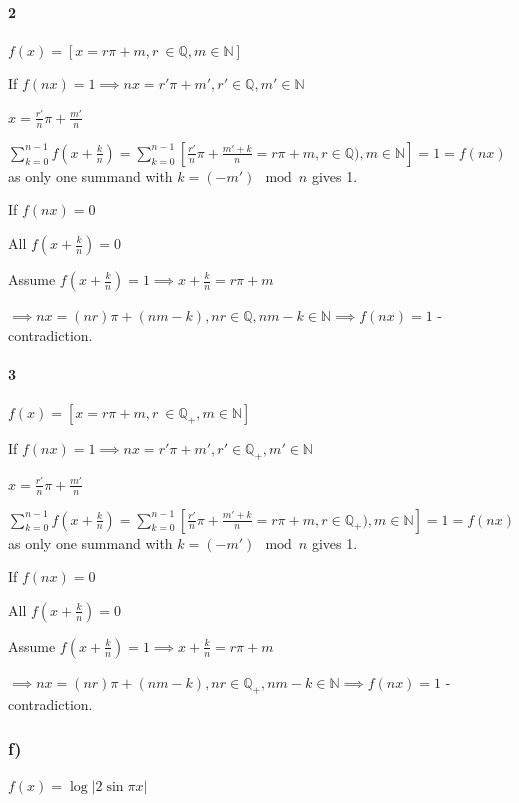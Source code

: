 \documentclass{article}
\begin{document}
\paragraph*{2}

\( f(x) = [x = r \pi + m, r\ \in \mathbb{Q}, m \in \mathbb{N}] \)

If \( f(nx) = 1 \implies nx = r' \pi + m', r' \in \mathbb{Q}, m' \in \mathbb{N} \)

\( x = \frac{r'}{n} \pi + \frac{m'}{n} \)

\( \sum_{k=0}^{n-1} f(x+\frac{k}{n}) = \sum_{k=0}^{n-1} [\frac{r'}{n} \pi + \frac{m'+k}{n} = r\pi + m, r \in \mathbb{Q)}, m \in \mathbb{N}] = 1 = f(nx) \) as only one summand with \( k = (-m') \mod n \) gives 1.

If \( f(nx) = 0 \)

All \( f(x+\frac{k}{n}) = 0 \)

Assume \( f(x+\frac{k}{n}) = 1 \implies x + \frac{k}{n} = r\pi + m \)

\( \implies nx = (nr)\pi + (nm - k), nr \in \mathbb{Q}, nm - k \in \mathbb{N} \implies f(nx) = 1 \) - contradiction.

\paragraph*{3}

\( f(x) = [x = r \pi + m, r\ \in \mathbb{Q_+}, m \in \mathbb{N}] \)

If \( f(nx) = 1 \implies nx = r' \pi + m', r' \in \mathbb{Q_+}, m' \in \mathbb{N} \)

\( x = \frac{r'}{n} \pi + \frac{m'}{n} \)

\( \sum_{k=0}^{n-1} f(x+\frac{k}{n}) = \sum_{k=0}^{n-1} [\frac{r'}{n} \pi + \frac{m'+k}{n} = r\pi + m, r \in \mathbb{Q_+)}, m \in \mathbb{N}] = 1 = f(nx) \) as only one summand with \( k = (-m') \mod n \) gives 1.

If \( f(nx) = 0 \)

All \( f(x+\frac{k}{n}) = 0 \)

Assume \( f(x+\frac{k}{n}) = 1 \implies x + \frac{k}{n} = r\pi + m \)

\( \implies nx = (nr)\pi + (nm - k), nr \in \mathbb{Q_+}, nm - k \in \mathbb{N} \implies f(nx) = 1 \) - contradiction.

\subsubsection*{f)}

\( f(x) = \log |2 \sin \pi x | \)
\end{document}
